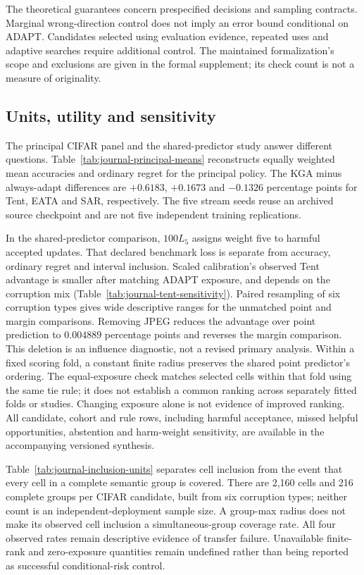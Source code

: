 The theoretical guarantees concern prespecified decisions and sampling
contracts. Marginal wrong-direction control does not imply an error bound
conditional on ADAPT. Candidates selected using evaluation evidence, repeated
uses and adaptive searches require additional control. The maintained
formalization's scope and exclusions are given in the formal supplement; its
check count is not a measure of originality.

\subsection{Units, utility and sensitivity}
The principal CIFAR panel and the shared-predictor study answer different
questions. Table~\ref{tab:journal-principal-means} reconstructs equally weighted
mean accuracies and ordinary regret for the principal policy. The KGA minus
always-adapt differences are $+0.6183$, $+0.1673$ and $-0.1326$ percentage points
for Tent, EATA and SAR, respectively. The five stream seeds reuse an archived
source checkpoint and are not five independent training replications.

In the shared-predictor comparison, $100L_5$ assigns weight five to harmful
accepted updates. That declared benchmark loss is separate from accuracy,
ordinary regret and interval inclusion. Scaled calibration's observed Tent
advantage is smaller after matching ADAPT exposure, and depends on the
corruption mix (Table~\ref{tab:journal-tent-sensitivity}). Paired resampling of
six corruption types gives wide descriptive ranges for the unmatched point
and margin comparisons. Removing JPEG reduces the advantage over point
prediction to $0.004889$ percentage points and reverses the margin comparison.
This deletion is an influence diagnostic, not a revised primary analysis.
Within a fixed scoring fold, a constant finite radius preserves the shared point
predictor's ordering. The equal-exposure check matches selected cells within that
fold using the same tie rule; it does not establish a common ranking across
separately fitted folds or studies. Changing exposure alone is not evidence of
improved ranking. All candidate,
cohort and rule rows, including harmful acceptance, missed helpful
opportunities, abstention and harm-weight sensitivity, are available in
the accompanying versioned synthesis.

Table~\ref{tab:journal-inclusion-units} separates cell inclusion from the event
that every cell in a complete semantic group is covered. There are 2,160 cells
and 216 complete groups per CIFAR candidate, built from six corruption types;
neither count is an independent-deployment sample size. A group-max radius
does not make its observed cell inclusion a simultaneous-group coverage rate.
All four observed rates remain descriptive evidence of transfer failure.
Unavailable finite-rank and zero-exposure quantities remain undefined rather
than being reported as successful conditional-risk control.

